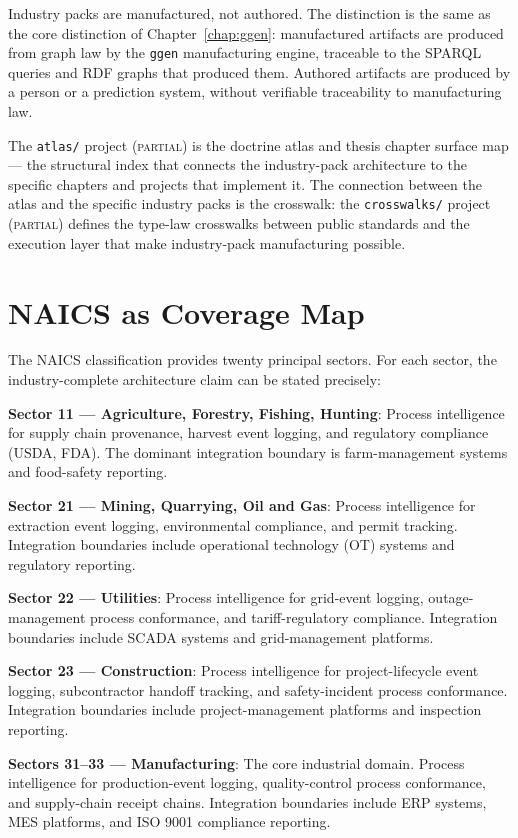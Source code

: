 Industry packs are manufactured, not authored. The distinction is the same as the core distinction of Chapter~\ref{chap:ggen}: manufactured artifacts are produced from graph law by the \texttt{ggen} manufacturing engine, traceable to the SPARQL queries and RDF graphs that produced them. Authored artifacts are produced by a person or a prediction system, without verifiable traceability to manufacturing law.

The \texttt{atlas/} project (\textsc{partial}) is the doctrine atlas and thesis chapter surface map --- the structural index that connects the industry-pack architecture to the specific chapters and projects that implement it. The connection between the atlas and the specific industry packs is the crosswalk: the \texttt{crosswalks/} project (\textsc{partial}) defines the type-law crosswalks between public standards and the execution layer that make industry-pack manufacturing possible.

\section{NAICS as Coverage Map}

The NAICS classification provides twenty principal sectors. For each sector, the industry-complete architecture claim can be stated precisely:

\textbf{Sector 11 --- Agriculture, Forestry, Fishing, Hunting}: Process intelligence for supply chain provenance, harvest event logging, and regulatory compliance (USDA, FDA). The dominant integration boundary is farm-management systems and food-safety reporting.

\textbf{Sector 21 --- Mining, Quarrying, Oil and Gas}: Process intelligence for extraction event logging, environmental compliance, and permit tracking. Integration boundaries include operational technology (OT) systems and regulatory reporting.

\textbf{Sector 22 --- Utilities}: Process intelligence for grid-event logging, outage-management process conformance, and tariff-regulatory compliance. Integration boundaries include SCADA systems and grid-management platforms.

\textbf{Sector 23 --- Construction}: Process intelligence for project-lifecycle event logging, subcontractor handoff tracking, and safety-incident process conformance. Integration boundaries include project-management platforms and inspection reporting.

\textbf{Sectors 31--33 --- Manufacturing}: The core industrial domain. Process intelligence for production-event logging, quality-control process conformance, and supply-chain receipt chains. Integration boundaries include ERP systems, MES platforms, and ISO 9001 compliance reporting.

